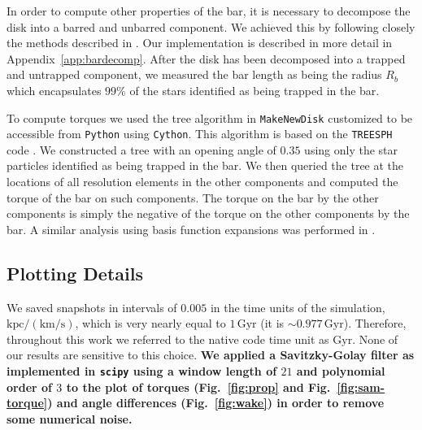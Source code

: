\documentclass[twocolumn,linenumbers,trackchanges]{aastex631}
\begin{document}
In order to compute other properties of the bar, it is necessary to decompose
the disk into a barred and unbarred component. We achieved this by following
closely the methods described in \citet{2016MNRAS.463.1952P,
2021MNRAS.500..838P}. Our implementation is described in more detail in
Appendix~\ref{app:bardecomp}. After the disk has been decomposed into a trapped
and untrapped component, we measured the bar length as being the radius $R_b$
which encapsulates $99\%$ of the stars identified as being trapped in the bar.

To compute torques we used the tree algorithm in \texttt{MakeNewDisk}
\citep{2005MNRAS.361..776S} customized to be accessible from \texttt{Python}
using \texttt{Cython}. This algorithm is based on the \texttt{TREESPH} code
\citep{1989ApJS...70..419H}. We constructed a tree with an opening angle of
$0.35$ using only the star particles identified as being trapped in the bar. We
then queried the tree at the locations of all resolution elements in the other
components and computed the torque of the bar on such components. The torque on
the bar by the other components is simply the negative of the torque on the
other components by the bar. A similar analysis using basis function expansions
was performed in \citet{2019MNRAS.490.3616P}.

\subsection{Plotting Details}
We saved snapshots in intervals of $0.005$ in the time units of the simulation,
$\textrm{kpc}/(\textrm{km}/\textrm{s})$, which is very nearly equal to
$1\,\textrm{Gyr}$ (it is $\sim0.977\,\textrm{Gyr}$). Therefore, throughout this
work we referred to the native code time unit as $\textrm{Gyr}$. None of our
results are sensitive to this choice. {\bf We applied a Savitzky-Golay filter
\citep{1964AnaCh..36.1627S} as implemented in \texttt{scipy} using a window
length of $21$ and polynomial order of $3$ to the plot of torques
(Fig.~\ref{fig:prop} and Fig.~\ref{fig:sam-torque}) and angle differences
(Fig.~\ref{fig:wake}) in order to remove some numerical noise.}
\end{document}
